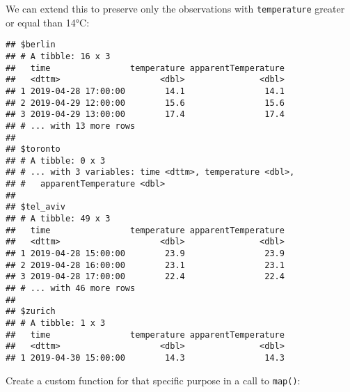 \documentclass[]{book}
\newenvironment{Shaded}{\begin{snugshade}}{\end{snugshade}}
\newcommand{\ControlFlowTok}[1]{\textcolor[rgb]{0.13,0.29,0.53}{\textbf{#1}}}
\newcommand{\DecValTok}[1]{\textcolor[rgb]{0.00,0.00,0.81}{#1}}
\newcommand{\KeywordTok}[1]{\textcolor[rgb]{0.13,0.29,0.53}{\textbf{#1}}}
\newcommand{\NormalTok}[1]{#1}
\newcommand{\OperatorTok}[1]{\textcolor[rgb]{0.81,0.36,0.00}{\textbf{#1}}}
\newcommand{\StringTok}[1]{\textcolor[rgb]{0.31,0.60,0.02}{#1}}
\begin{document}
We can extend this to preserve only the observations with \texttt{temperature} greater or equal than 14°C:

\begin{Shaded}
\end{Shaded}

\begin{verbatim}
## $berlin
## # A tibble: 16 x 3
##   time                temperature apparentTemperature
##   <dttm>                    <dbl>               <dbl>
## 1 2019-04-28 17:00:00        14.1                14.1
## 2 2019-04-29 12:00:00        15.6                15.6
## 3 2019-04-29 13:00:00        17.4                17.4
## # ... with 13 more rows
## 
## $toronto
## # A tibble: 0 x 3
## # ... with 3 variables: time <dttm>, temperature <dbl>,
## #   apparentTemperature <dbl>
## 
## $tel_aviv
## # A tibble: 49 x 3
##   time                temperature apparentTemperature
##   <dttm>                    <dbl>               <dbl>
## 1 2019-04-28 15:00:00        23.9                23.9
## 2 2019-04-28 16:00:00        23.1                23.1
## 3 2019-04-28 17:00:00        22.4                22.4
## # ... with 46 more rows
## 
## $zurich
## # A tibble: 1 x 3
##   time                temperature apparentTemperature
##   <dttm>                    <dbl>               <dbl>
## 1 2019-04-30 15:00:00        14.3                14.3
\end{verbatim}

Create a custom function for that specific purpose in a call to \texttt{map()}:

\begin{Shaded}
\end{Shaded}
\end{document}
